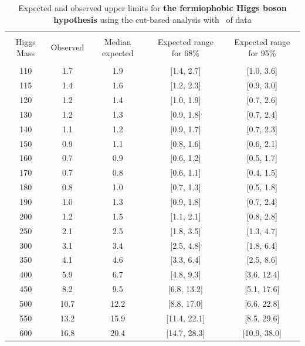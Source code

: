 \begin{table}[hbp!]
\begin{center}
\begin{tabular}{c c c c c}
\hline
\vspace{-3mm} && \\
 Higgs Mass   & Observed & Median expected & Expected range for 68\% & Expected range for 95\%   \\
\vspace{-3mm} && \\
\hline
110 & 1.7 & 1.9 & [1.4, 2.7] & [1.0, 3.6] \\
115 & 1.4 & 1.6 & [1.2, 2.3] & [0.9, 3.0] \\
120 & 1.2 & 1.4 & [1.0, 1.9] & [0.7, 2.6] \\
130 & 1.2 & 1.3 & [0.9, 1.8] & [0.7, 2.4] \\
140 & 1.1 & 1.2 & [0.9, 1.7] & [0.7, 2.3] \\
150 & 0.9 & 1.1 & [0.8, 1.6] & [0.6, 2.1] \\
160 & 0.7 & 0.9 & [0.6, 1.2] & [0.5, 1.7] \\
170 & 0.7 & 0.8 & [0.6, 1.1] & [0.4, 1.5] \\
180 & 0.8 & 1.0 & [0.7, 1.3] & [0.5, 1.8] \\
190 & 1.0 & 1.3 & [0.9, 1.8] & [0.7, 2.4] \\
200 & 1.2 & 1.5 & [1.1, 2.1] & [0.8, 2.8] \\
250 & 2.1 & 2.5 & [1.8, 3.5] & [1.3, 4.7] \\
300 & 3.1 & 3.4 & [2.5, 4.8] & [1.8, 6.4] \\
350 & 4.1 & 4.6 & [3.3, 6.4] & [2.5, 8.6] \\
400 & 5.9 & 6.7 & [4.8, 9.3] & [3.6, 12.4] \\
450 & 8.2 & 9.5 & [6.8, 13.2] & [5.1, 17.6] \\
500 & 10.7 & 12.2 & [8.8, 17.0] & [6.6, 22.8] \\
550 & 13.2 & 15.9 & [11.4, 22.1] & [8.5, 29.6] \\
600 & 16.8 & 20.4 & [14.7, 28.3] & [10.9, 38.0] \\
\hline
\end{tabular}
\caption{Expected and observed upper limits for {\bf the fermiophobic
    Higgs boson hypothesis} using the cut-based analysis with
  \intlumi\ of data}
\label{tab:cutbase_uls_fp}
\end{center}
\end{table}
